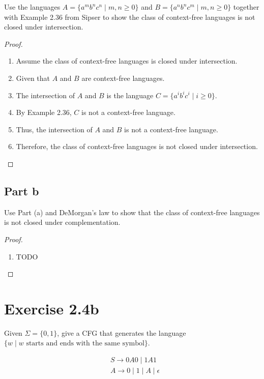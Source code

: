 \documentclass{article}
\newcommand{\where}{\mid}
\begin{document}
Use the languages $A = \{ a^m b^n c^n \where m, n \geq 0 \}$ and $B = \{ a^n b^n
c^m \where m, n \geq 0 \}$ together with Example 2.36 from Sipser to show the
class of context-free languages is not closed under intersection.

\begin{proof}
	\mbox{}
	\begin{enumerate}
	  \item Assume the class of context-free languages is closed under
	  intersection.
	  \item Given that $A$ and $B$ are context-free languages.
	  \item The intersection of $A$ and $B$ is the language $C = \{ a^i b^i c^i 
	  \where i \geq 0\}$. 
	  \item By Example 2.36, $C$ is not a context-free language.
	  \item Thus, the intersection of $A$ and $B$ is not a context-free language.
	  \item Therefore, the class of context-free languages is not closed under
	  intersection. \qedhere
	\end{enumerate}
\end{proof}

\subsection{Part b}

Use Part (a) and DeMorgan's law to show that the class of context-free languages
is not closed under complementation.

\begin{proof}
	\mbox{}
	\begin{enumerate}
	  \item TODO
	\end{enumerate}
\end{proof}

\section{Exercise 2.4b}

Given $\Sigma = \{0, 1\}$, give a CFG that generates the language $\{ w \where
w \text{ starts and ends with the same symbol} \}$.

\begin{align*}
	&S \rightarrow 0A0 \mid 1A1\\
	&A \rightarrow 0 \mid 1 \mid A \mid \epsilon
\end{align*}
\end{document}
